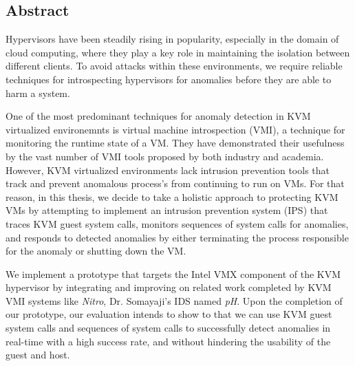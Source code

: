 \documentclass{report}
\begin{document}
\begin{spacing}{1.5}











\newpage
{}
\chapter*{Abstract}

{\large
Hypervisors have been steadily rising in popularity, especially in the domain of cloud computing, where they play a key role in maintaining the isolation between different clients. To avoid attacks within these environments, we require reliable techniques for introspecting hypervisors for anomalies before they are able to harm a system.
\newline
}

{\large
\noindent One of the most predominant techniques for anomaly detection in KVM virtualized environemnts is virtual machine introspection (VMI), a technique for monitoring the runtime state of a VM. They have demonstrated their usefulness by the vast number of VMI tools proposed by both industry and academia. However, KVM virtualized environments lack intrusion prevention tools that track and prevent anomalous process's from continuing to run on VMs. For that reason, in this thesis, we decide to take a holistic approach to protecting KVM VMs by attempting to implement an intrusion prevention system (IPS) that traces KVM guest system calls, monitors sequences of system calls for anomalies, and responds to detected anomalies by either terminating the process responsible for the anomaly or shutting down the VM. 
\newline
}


{\large
\noindent We implement a prototype that targets the Intel VMX component of the KVM hypervisor by integrating and improving on related work completed by KVM VMI systems like \textit{Nitro}, Dr. Somayaji's IDS named \textit{pH}. Upon the completion of our prototype, our evaluation intends to show to that we can use KVM guest system calls and sequences of system calls to successfully detect anomalies in real-time with a high success rate, and without hindering the usability of the guest and host.
\newline
}

\setcounter{tocdepth}{2}
\setcounter{secnumdepth}{2}









\end{spacing}
\end{document}
